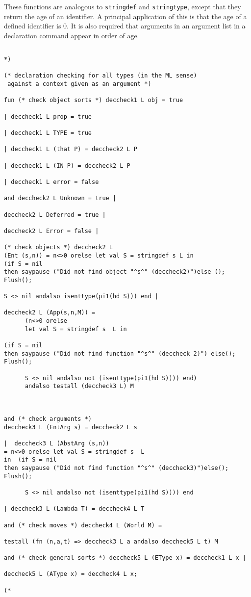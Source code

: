 \documentclass{article}
\begin{document}
These functions are analogous to {\tt stringdef} and {\tt stringtype}, except that they return the age of an identifier.  A principal application of this is that the age of a defined identifier is 0.
It is also required that arguments in an argument list in a declaration command appear in order of age.

\begin{verbatim}

*)

(* declaration checking for all types (in the ML sense)
 against a context given as an argument *)

fun (* check object sorts *) deccheck1 L obj = true

| deccheck1 L prop = true

| deccheck1 L TYPE = true

| deccheck1 L (that P) = deccheck2 L P 

| deccheck1 L (IN P) = deccheck2 L P

| deccheck1 L error = false

and deccheck2 L Unknown = true |

deccheck2 L Deferred = true |

deccheck2 L Error = false |

(* check objects *) deccheck2 L 
(Ent (s,n)) = n<>0 orelse let val S = stringdef s L in 
(if S = nil 
then saypause ("Did not find object "^s^" (deccheck2)")else (); 
Flush();     

S <> nil andalso isenttype(pi1(hd S))) end |

deccheck2 L (App(s,n,M)) =
      (n<>0 orelse
      let val S = stringdef s  L in

(if S = nil 
then saypause ("Did not find function "^s^" (deccheck 2)") else();  
Flush();

      S <> nil andalso not (isenttype(pi1(hd S)))) end)
      andalso testall (deccheck3 L) M

      

and (* check arguments *) 
deccheck3 L (EntArg s) = deccheck2 L s

|  deccheck3 L (AbstArg (s,n)) 
= n<>0 orelse let val S = stringdef s  L 
in  (if S = nil 
then saypause ("Did not find function "^s^" (deccheck3)")else();
Flush();

      S <> nil andalso not (isenttype(pi1(hd S)))) end

| deccheck3 L (Lambda T) = deccheck4 L T

and (* check moves *) deccheck4 L (World M) =

testall (fn (n,a,t) => deccheck3 L a andalso deccheck5 L t) M

and (* check general sorts *) deccheck5 L (EType x) = deccheck1 L x |

deccheck5 L (AType x) = deccheck4 L x;

(*

\end{verbatim}
\end{document}
